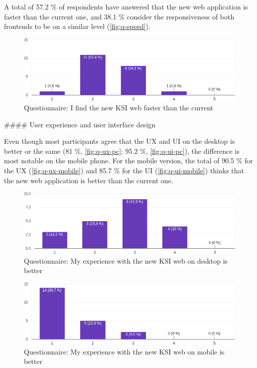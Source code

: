 \documentclass[
  digital, %
  oneside, %
  lof,     %
  nolot,     %
]{fithesis4}
\begin{document}
{A total of 57.2 \% of respondents have answered that the new web application is faster than the current one, and 38.1 \% consider the responsiveness of both frontends to be on a similar level (\autoref{fig:q-speed}).

\begin{figure}
\includegraphics[width=\textwidth]{assets/img/questionare/faster}
\caption{Questionnaire: I find the new \acrshort{KSI} web faster than the current}
\label{fig:q-speed}
\end{figure}


#### User experience and user interface design

Even though most participants agree that the \acrshort{UX} and \acrshort{UI} on the desktop is better or the same (81 \%, \autoref{fig:q-ux-pc}; 95.2 \%, \autoref{fig:q-ui-pc}), the difference is most notable on the mobile phone. For the mobile version, the total of 90.5 \% for the \acrshort{UX} (\autoref{fig:q-ux-mobile}) and  85.7 \% for the \acrshort{UI} (\autoref{fig:q-ui-mobile}) thinks that the new web application is better than the current one.

\begin{figure}
\includegraphics[width=\textwidth]{assets/img/questionare/pc-ux}
\caption{Questionnaire: My experience with the new \acrshort{KSI} web on desktop is better}
\label{fig:q-ux-pc}
\end{figure}

\begin{figure}
\includegraphics[width=\textwidth]{assets/img/questionare/mobile-ux}
\caption{Questionnaire: My experience with the new \acrshort{KSI} web on mobile is better}
\label{fig:q-ux-mobile}
\end{figure}

}
\end{document}
